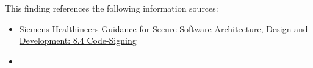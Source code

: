 


This finding references the following information sources:

\begin{itemize}
	\item \href{https://doku-center.med.siemens.de/regelwerke/L4U-Intranet/GD/GD-41/GD-41-03-E.pdf}{Siemens Healthineers Guidance for Secure Software Architecture, Design and
	Development: 8.4 Code-Signing}
	\item {}
\end{itemize}

